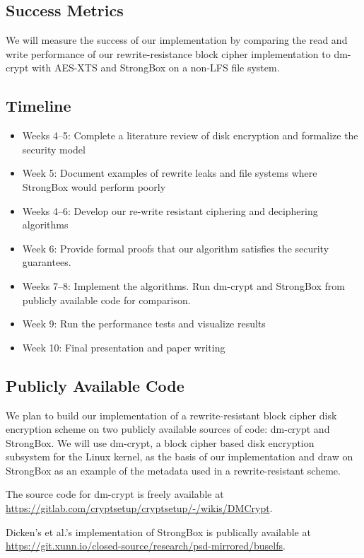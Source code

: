 \documentclass[11pt,twocolumn]{article}
\begin{document}
	\subsection*{Success Metrics}
	We will measure the success of our implementation by comparing the read and write performance of our rewrite-resistance block cipher implementation to dm-crypt with AES-XTS and StrongBox on a non-LFS file system.
	
	\subsection*{Timeline}
	
	\begin{itemize}
		\item Weeks 4--5: Complete a literature review of disk encryption and formalize the security model
		\item Week 5: Document examples of rewrite leaks and file systems where StrongBox would perform poorly
		\item Weeks 4--6: Develop our re-write resistant ciphering and deciphering algorithms
		\item Week 6: Provide formal proofs that our algorithm satisfies the security guarantees.
		\item Weeks 7--8: Implement the algorithms. Run dm-crypt and StrongBox from publicly available code for comparison.
		\item Week 9: Run the performance tests and visualize results
		\item Week 10: Final presentation and paper writing
	\end{itemize}
	
	\subsection*{Publicly Available Code}
	We plan to build our implementation of a rewrite-resistant block cipher disk encryption scheme on two publicly available sources of code: dm-crypt and StrongBox. We will use dm-crypt, a block cipher based disk encryption subsystem for the Linux kernel, as the basis of our implementation and draw on StrongBox as an example of the metadata used in a rewrite-resistant scheme.
	
	The source code for dm-crypt is freely available at \url{https://gitlab.com/cryptsetup/cryptsetup/-/wikis/DMCrypt}.
	
	Dicken's et al.'s implementation of StrongBox is publically available at \url{https://git.xunn.io/closed-source/research/psd-mirrored/buselfs}.
	
	
	
	
\end{document}
